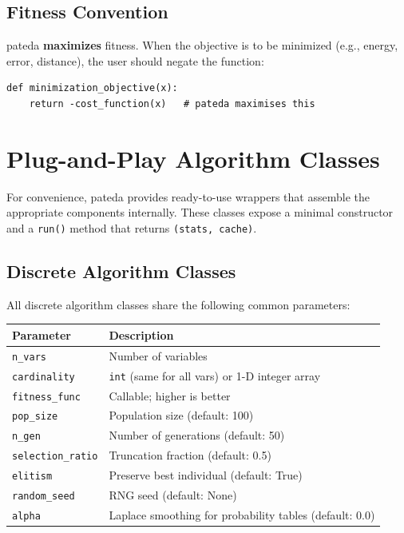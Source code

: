 \documentclass[a4paper,11pt]{article}
\begin{document}
\subsection{Fitness Convention}

pateda \textbf{maximizes} fitness.  When the objective is to be minimized (e.g.,
energy, error, distance), the user should negate the function:

\begin{lstlisting}
def minimization_objective(x):
    return -cost_function(x)   # pateda maximises this
\end{lstlisting}

\section{Plug-and-Play Algorithm Classes}
\label{sec:algorithms}

For convenience, pateda provides ready-to-use wrappers that assemble the
appropriate components internally.  These classes expose a minimal constructor
and a \texttt{run()} method that returns \texttt{(stats, cache)}.

\subsection{Discrete Algorithm Classes}

All discrete algorithm classes share the following common parameters:

\begin{center}
\begin{tabular}{lp{9cm}}
\toprule
Parameter & Description \\
\midrule
\texttt{n\_vars} & Number of variables \\
\texttt{cardinality} & \texttt{int} (same for all vars) or 1-D integer array \\
\texttt{fitness\_func} & Callable; higher is better \\
\texttt{pop\_size} & Population size (default: 100) \\
\texttt{n\_gen} & Number of generations (default: 50) \\
\texttt{selection\_ratio} & Truncation fraction (default: 0.5) \\
\texttt{elitism} & Preserve best individual (default: True) \\
\texttt{random\_seed} & RNG seed (default: None) \\
\texttt{alpha} & Laplace smoothing for probability tables (default: 0.0) \\
\bottomrule
\end{tabular}
\end{center}
\end{document}
